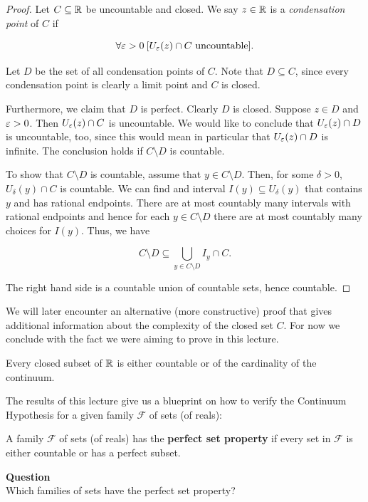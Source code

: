\begin{proof}Let $C \subseteq \mathbb{R}$ be uncountable and closed. We say $z \in \mathbb{R}$ is a \textit{condensation point} of $C$ if

\begin{equation}
\forall \varepsilon > 0 \:[ U_\varepsilon(z) \cap C \text{ uncountable}].
\end{equation}

Let $D$ be the set of all condensation points of $C$. Note that $D \subseteq C$, since every condensation point is clearly a limit point and $C$ is closed.

Furthermore, we claim that $D$ is perfect. Clearly $D$ is closed. Suppose $z \in D$ and $\varepsilon > 0$. Then $U_\varepsilon(z) \cap C$ is uncountable. We would like to conclude that $U_\varepsilon(z) \cap D$ is uncountable, too, since this would mean in particular that $U_\varepsilon(z) \cap D$ is infinite. The conclusion holds if $C \setminus D$ is countable.

To show that $C\setminus D$ is countable, assume that $y \in C \setminus D$. Then, for some $\delta > 0$, $U_\delta(y) \cap C$ is countable. We can find and interval $I(y) \subseteq U_\delta(y)$ that contains $y$ and has rational endpoints. There are at most countably many intervals with rational endpoints and hence for each $y \in C \setminus D$ there are at most countably many choices for $I(y)$. Thus, we have

\begin{equation}
C\setminus D \subseteq \bigcup_{y \in C \setminus D} I_y \cap C.
\end{equation}

The right hand side is a countable union of countable sets, hence countable.

\end{proof}We will later encounter an alternative (more constructive) proof that gives additional information about the complexity of the closed set $C$. For now we conclude with the fact we were aiming to prove in this lecture.

\begin{corollary}Every closed subset of $\mathbb{R}$ is either countable or of the cardinality of the continuum.

\end{corollary}The results of this lecture give us a blueprint on how to verify the Continuum Hypothesis for a given family $\mathcal{F}$ of sets (of reals):

A family $\mathcal{F}$ of sets (of reals) has the \textbf{perfect set property} if every set in $\mathcal{F}$ is either countable or has a perfect subset.

\begin{framed}
\textbf{Question}\\
Which families of sets have the perfect set property?
\end{framed}